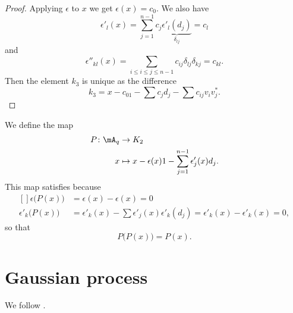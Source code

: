 \begin{proof}
	Applying $\epsilon$ to $x$ we get $\epsilon(x)=c_0$. We also have
	\begin{equation}
		\epsilon'_l(x)=\sum_{j=1}^{n-1}c_j\underbrace{\epsilon'_l(d_j)}_{\delta_{lj}}=c_l
	\end{equation}
	and
	\begin{equation}
		\epsilon''_{kl}(x)=\sum_{i\leq i\leq j\leq n-1}c_{ij}\delta_{lj}\delta_{kj}=c_{kl}.
	\end{equation}
	Then the element $k_3$ is unique as the difference
	\begin{equation}
		k_3=x-c_01-\sum c_jd_j-\sum c_{ij}v_iv_j^*.
	\end{equation}
\end{proof}

We define the map
\begin{equation}
	\begin{aligned}
		P\colon \mA_q & \to K_2 \                                                 \\
		x             & \mapsto x-\epsilon(x)1-\sum_{j=1}^{n-1}\epsilon'_j(x)d_j.
	\end{aligned}
\end{equation}
This map satisfies because
\begin{equation}
	\begin{aligned}[]
		\epsilon\big( P(x) \big)    & =\epsilon(x)-\epsilon(x)=0                                                          \\
		\epsilon'_k\big( P(x) \big) & =\epsilon'_k(x)-\sum\epsilon'_j(x)\epsilon'_k(d_j)=\epsilon'_k(x)-\epsilon'_k(x)=0,
	\end{aligned}
\end{equation}
so that
\begin{equation}
	P\big( P(x) \big)=P(x).
\end{equation}



\section{Gaussian process}

We follow \cite{UweLevy}.

